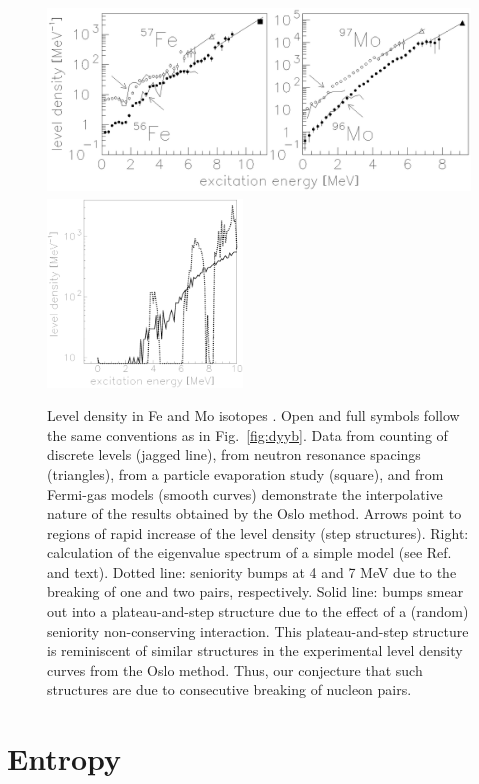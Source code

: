 \documentclass[sort&compress,final,numberedheadings]{aipproc}
\begin{document}
\begin{figure}
\includegraphics[height=5cm]{fig2a.eps}
\includegraphics[height=5cm]{fig2b.eps}
\caption{Level density in Fe and Mo isotopes \protect\cite{SA03}. Open and full
symbols follow the same conventions as in Fig.\ \protect\ref{fig:dyyb}. Data 
from counting of discrete levels (jagged line), from neutron resonance spacings
(triangles), from a particle evaporation study (square), and from Fermi-gas 
models (smooth curves) demonstrate the interpolative nature of the results 
obtained by the Oslo method. Arrows point to regions of rapid increase of the 
level density (step structures). Right: calculation of the eigenvalue spectrum 
of a simple model (see Ref.\ \protect\cite{SA03} and text). Dotted line: 
seniority bumps at 4 and 7 MeV due to the breaking of one and two pairs, 
respectively. Solid line: bumps smear out into a plateau-and-step structure due
to the effect of a (random) seniority non-conserving interaction. This 
plateau-and-step structure is reminiscent of similar structures in the 
experimental level density curves from the Oslo method. Thus, our conjecture 
that such structures are due to consecutive breaking of nucleon pairs.}
\label{fig:femotheo}
\end{figure}

\section{Entropy}
\label{sect:entropy}
\end{document}
